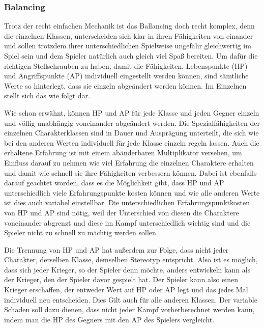 \subsubsection{Balancing} Trotz der recht einfachen Mechanik ist das Ballancing doch recht komplex, denn die einzelnen Klassen, unterscheiden sich klar in ihren Fähigkeiten von einander und sollen trotzdem ihrer unterschiedlichen Spielweise ungefähr gleichwertig im Spiel sein und dem Spieler natürlich auch gleich viel Spaß bereiten. Um dafür die richtigen Stellschrauben zu haben, damit die Fähigkeiten, Lebenspunkte (HP) und Angriffspunkte (AP) individuell eingestellt werden können, sind sämtliche Werte so hinterlegt, dass sie einzeln abgeändert werden können. Im Einzelnen stellt sich das wie folgt dar. 

Wie schon erwähnt, können HP und AP für jede Klasse und jeden Gegner einzeln und völlig unabhängig voneinander abgeändert werden. Die Spezialfähigkeiten der einzelnen Charakterklassen sind in Dauer und Ausprägung unterteilt, die sich wie bei den anderen Werten individuell für jede Klasse einzeln regeln lassen. Auch die erhaltene Erfahrung ist mit einem abänderbaren Multiplikator versehen, um Einfluss darauf zu nehmen wie viel Erfahrung die einzelnen Charaktere erhalten und damit wie schnell sie ihre Fähigkeiten verbessern können. Dabei ist ebenfalls darauf geachtet worden, dass es die Möglichkeit gibt, dass HP und AP unterschiedlich viele Erfahrungspunkte kosten können und wie alle anderen Werte ist dies auch variabel einstellbar. Die unterschiedlichen Erfahrungspunktkosten von HP und AP sind nötig, weil der Unterschied von diesen die Charaktere voneinander abgrenzt und diese im Kampf unterschiedlich wichtig sind und die Spieler nicht zu schnell zu mächtig werden sollen.

Die Trennung von HP und AP hat außerdem zur Folge, dass nicht jeder Charakter, derselben Klasse, demselben Stereotyp entspricht. Also ist es möglich, dass sich jeder Krieger, so der Spieler denn möchte, anders entwickeln kann als der Krieger, den der Spieler davor gespielt hat. Der Spieler kann also einen Krieger erschaffen, der entweder Wert auf HP oder AP legt und das jedes Mal individuell neu entscheiden. Dies Gilt auch für alle anderen Klassen. Der variable Schaden soll dazu dienen, dass nicht jeder Kampf vorherberechnet werden kann, indem man die HP des Gegners mit den AP des Spielers vergleicht.

